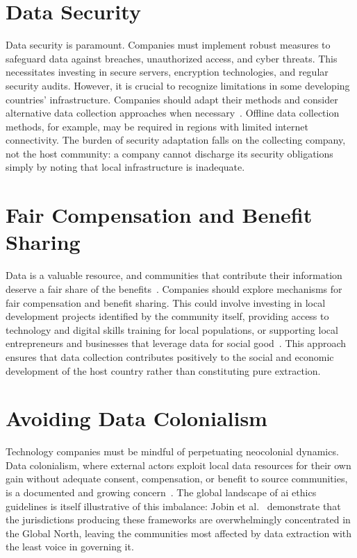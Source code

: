 \documentclass[11pt,showkeys]{essay}
\begin{document}
\section{Data Security}

Data security is paramount. Companies must implement robust measures to safeguard data against breaches, unauthorized access, and cyber threats. This necessitates investing in secure servers, encryption technologies, and regular security audits. However, it is crucial to recognize limitations in some developing countries' infrastructure. Companies should adapt their methods and consider alternative data collection approaches when necessary~\cite{runde_innovative_2022}. Offline data collection methods, for example, may be required in regions with limited internet connectivity. The burden of security adaptation falls on the collecting company, not the host community: a company cannot discharge its security obligations simply by noting that local infrastructure is inadequate.

\section{Fair Compensation and Benefit Sharing}

Data is a valuable resource, and communities that contribute their information deserve a fair share of the benefits~\cite{runde_innovative_2022}. Companies should explore mechanisms for fair compensation and benefit sharing. This could involve investing in local development projects identified by the community itself, providing access to technology and digital skills training for local populations, or supporting local entrepreneurs and businesses that leverage data for social good~\cite{hanna_digital_2017}. This approach ensures that data collection contributes positively to the social and economic development of the host country rather than constituting pure extraction.

\section{Avoiding Data Colonialism}

Technology companies must be mindful of perpetuating neocolonial dynamics. Data colonialism, where external actors exploit local data resources for their own gain without adequate consent, compensation, or benefit to source communities, is a documented and growing concern~\cite{edwards_slave_2017}. The global landscape of \gls{ai} ethics guidelines is itself illustrative of this imbalance: Jobin et al.~\cite{jobin_global_2019} demonstrate that the jurisdictions producing these frameworks are overwhelmingly concentrated in the Global North, leaving the communities most affected by data extraction with the least voice in governing it.
\end{document}

